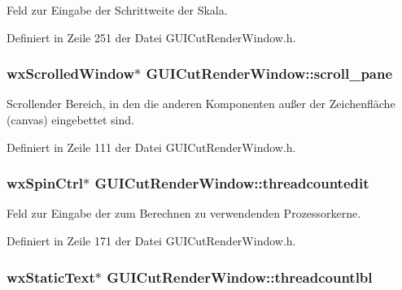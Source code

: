 Feld zur Eingabe der Schrittweite der Skala. 



Definiert in Zeile 251 der Datei G\-U\-I\-Cut\-Render\-Window.\-h.

\hypertarget{classGUICutRenderWindow_a28c430f7145860ba3265fa9b8417923d}{
\subsubsection[{scroll\-\_\-pane}]{\setlength{\rightskip}{0pt plus 5cm}wx\-Scrolled\-Window$\ast$ G\-U\-I\-Cut\-Render\-Window\-::scroll\-\_\-pane\hspace{0.3cm}{\ttfamily [private]}}}\label{classGUICutRenderWindow_a28c430f7145860ba3265fa9b8417923d}


Scrollender Bereich, in den die anderen Komponenten außer der Zeichenfläche (canvas) eingebettet sind. 



Definiert in Zeile 111 der Datei G\-U\-I\-Cut\-Render\-Window.\-h.

\hypertarget{classGUICutRenderWindow_ae48406dc8c80240904ca7040b7b3fbf1}{
\subsubsection[{threadcountedit}]{\setlength{\rightskip}{0pt plus 5cm}wx\-Spin\-Ctrl$\ast$ G\-U\-I\-Cut\-Render\-Window\-::threadcountedit\hspace{0.3cm}{\ttfamily [private]}}}\label{classGUICutRenderWindow_ae48406dc8c80240904ca7040b7b3fbf1}


Feld zur Eingabe der zum Berechnen zu verwendenden Prozessorkerne. 



Definiert in Zeile 171 der Datei G\-U\-I\-Cut\-Render\-Window.\-h.

\hypertarget{classGUICutRenderWindow_a2797a52c219092ce3f54ea62ec4b95f3}{
\subsubsection[{threadcountlbl}]{\setlength{\rightskip}{0pt plus 5cm}wx\-Static\-Text$\ast$ G\-U\-I\-Cut\-Render\-Window\-::threadcountlbl\hspace{0.3cm}{\ttfamily [private]}}}\label{classGUICutRenderWindow_a2797a52c219092ce3f54ea62ec4b95f3}


